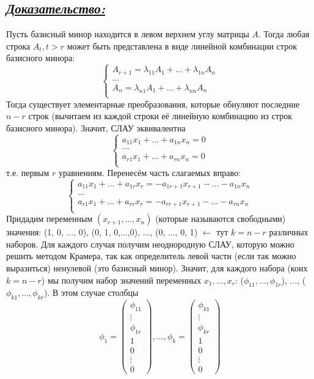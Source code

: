 \documentclass{article}
\begin{document}
\subsection*{\Large \underline{\textit{Доказательство: }}}
Пусть базисный минор находится в левом верхнем углу матрицы $A$. Тогда любая строка $A_t, t > r$ может быть представлена в виде линейной комбинации строк базисного минора:
$$
\begin{cases}
A_{r + 1} = \lambda_{11}A_1 + ... + \lambda_{1n}A_n \\
... \\ 
A_{n} = \lambda_{n1}A_1 + ... + \lambda_{nn}A_n \\
\end{cases}
$$
Тогда существует элементарные преобразования, которые обнуляют последние $n - r$ строк (вычитаем из каждой строки её линейную комбинацию из строк базисного минора). Значит, СЛАУ эквивалентна
$$
\begin{cases}
a_{11}x_1 + ... + a_{1n}x_n = 0 \\
... \\
a_{r1}x_1 + ... + a_{rn}x_n = 0 \\
\end{cases}
$$
т.е. первым $r$ уравнениям. Перенесём часть слагаемых вправо:
$$
\begin{cases}
a_{11}x_1 + ... + a_{1r}x_r = - a_{1r+1}x_{r + 1} - ... - a_{1n}x_n \\
... \\
a_{r1}x_1 + ... + a_{rr}x_r = - a_{rr+1}x_{r + 1} - ... - a_{rn}x_n \\
\end{cases}
$$
Придадим переменным $(x_{r + 1}, ..., x_{n})$ (которые называются свободными) значения: (1, 0, ..., 0), (0, 1, 0,...,0), ..., (0, ..., 0, 1) $\leftarrow$ тут $k = n - r$ различных наборов. Для каждого случая получим неоднородную СЛАУ, которую можно решить методом Крамера, так как определитель левой части (если так можно выразиться) ненулевой (это базисный минор). Значит, для каждого набора (коих $k = n - r$) мы получим набор значений переменных $x_1, ..., x_r$: ($\phi_{11}, ..., \phi_{1r}$), ..., ($\phi_{k1}, ..., \phi_{kr}$). В этом случае столбцы 
$$
\phi_1 = \begin{pmatrix}
\phi_{11} \\ \vdots \\ \phi_{1r} \\ 1 \\ 0 \\ \vdots \\ 0
\end{pmatrix}, ... ,
\phi_{k} = \begin{pmatrix}
\phi_{k1} \\ \vdots \\ \phi_{kr} \\ 1 \\ 0 \\ \vdots \\ 0
\end{pmatrix}
$$
\end{document}
